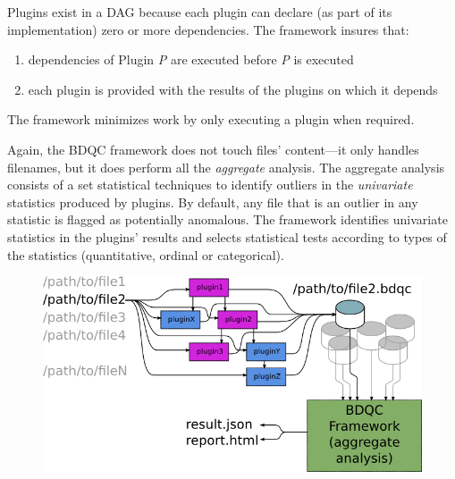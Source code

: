 \documentclass {article}
\begin{document}
Plugins exist in a DAG because each plugin can declare (as part of its
implementation) zero or more dependencies. The framework insures that:
\begin{enumerate}
\item dependencies of Plugin \emph{P} are executed before \emph{P} is executed
\item each plugin is provided with the results of the plugins on which it
	depends
\end{enumerate}

The framework minimizes work by only executing a plugin when required.

Again, the BDQC framework does not touch files' content---it only handles
filenames, but it does perform all the \emph{aggregate} analysis.
The aggregate analysis consists of a set statistical techniques to
identify outliers in the \emph{univariate} statistics produced by plugins.
By default, any file that is an outlier in any statistic is flagged as
potentially anomalous.
The framework identifies univariate statistics in the plugins' results
and selects statistical tests according to types of the statistics
(quantitative, ordinal or categorical).


{\centering
\begin{figure}[h]
\includegraphics[scale=0.8]{dataflow}
\end{figure}
}
\end{document}
